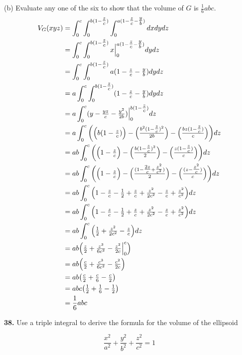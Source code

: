 \documentclass[11pt]{report}
\begin{document}
(b) Evaluate any one of the six to show that the volume of $G$ is $\tfrac{1}{6} abc$. \\
\begin{equation}
	\begin{split}
		V_G(xyz)&=\int_0^{c}\int_0^{b(1-\tfrac{z}{c})}\int_0^{a(1-\tfrac{z}{c}-\tfrac{y}{b})}dxdydz\\
				&=\int_0^{c}\int_0^{b(1-\tfrac{z}{c})}x\Big|_0^{a(1-\tfrac{z}{c}-\tfrac{y}{b})}dydz\\
				&=\int_0^{c}\int_0^{b(1-\tfrac{z}{c})}a(1-\tfrac{z}{c}-\tfrac{y}{b})dydz\\
				&=a\int_0^{c}\int_0^{b(1-\tfrac{z}{c})}(1-\tfrac{z}{c}-\tfrac{y}{b})dydz\\
				&=a\int_0^{c}(y-\tfrac{yz}{c}-\tfrac{y^2}{2b})\Big|_0^{b(1-\tfrac{z}{c})}dz\\
				&=a\int_0^{c}\bigg( \Big( b(1-\tfrac{z}{c}) \Big)-\Big( \tfrac{b^2(1-\tfrac{z}{c})^2}{2b} \Big)-
					\Big( \tfrac{bz(1-\tfrac{z}{c})}{c} \Big) \bigg)dz\\
				&=ab\int_0^{c}\bigg( \Big( 1-\tfrac{z}{c} \Big)-\Big( \tfrac{b(1-\tfrac{z}{c})^2}{2} \Big)-
					\Big( \tfrac{z(1-\tfrac{z}{c})}{c} \Big) \bigg)dz\\
				&=ab\int_0^{c}\bigg( \Big( 1-\tfrac{z}{c} \Big)-\Big( \tfrac{(1-\tfrac{2z}{c}+\tfrac{z^2}{c^2})}{2} \Big)-
					\Big( \tfrac{(z-\tfrac{z^2}{c})}{c} \Big) \bigg)dz\\
				&=ab\int_0^{c}\Big( 1-\tfrac{z}{c}-\tfrac{1}{2}+\tfrac{z}{c}+\tfrac{z^2}{2c^2}-
					\tfrac{z}{c}+\tfrac{z^2}{c^2} \Big)dz\\
				&=ab\int_0^{c}\Big( 1-\tfrac{z}{c}-\tfrac{1}{2}+\tfrac{z}{c}+\tfrac{z^2}{2c^2}-
					\tfrac{z}{c}+\tfrac{z^2}{c^2} \Big)dz\\
				&=ab\int_0^{c}\Big( \tfrac{1}{2}+\tfrac{z^2}{2c^2}-\tfrac{z}{c} \Big)dz\\
				&=ab\Big( \tfrac{z}{2}+\tfrac{z^3}{6c^2}-\tfrac{z^2}{2c}\Big|_0^c \Big)\\
				&=ab\Big( \tfrac{c}{2}+\tfrac{c^3}{6c^2}-\tfrac{c^2}{2c} \Big)\\
				&=ab\big( \tfrac{c}{2}+\tfrac{c}{6}-\tfrac{c}{2} \big)\\
				&=abc\big( \tfrac{1}{2}+\tfrac{1}{6}-\tfrac{1}{2} \big)\\
				&=\frac{1}{6}abc\\
	\end{split}
\end{equation}

\textbf{38.} Use a triple integral to derive the formula for the volume of the ellipsoid

\[ \frac{x^2}{a^2} + \frac{y^2}{b^2} + \frac{z^2}{c^2} = 1 \]
\end{document}
